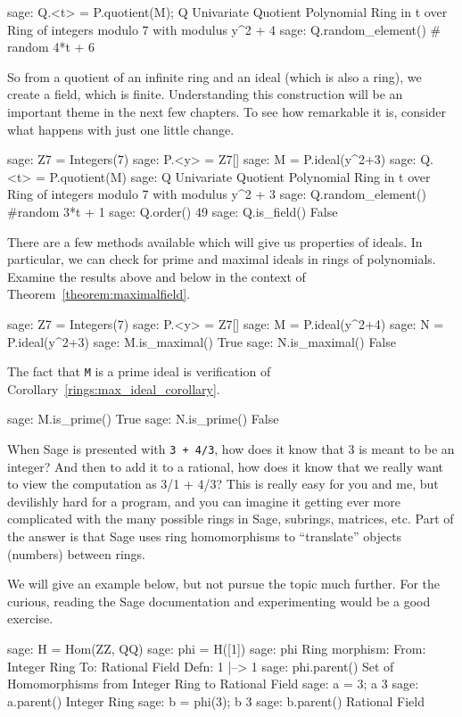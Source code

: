 %
\begin{sageexample}
sage: Q.<t> = P.quotient(M); Q
Univariate Quotient Polynomial Ring in t over
Ring of integers modulo 7 with modulus y^2 + 4
sage: Q.random_element() # random
4*t + 6
\end{sageexample}
%
So from a quotient of an infinite ring and an ideal (which is also a ring), we create a field, which is finite.  Understanding this construction will be an important theme in the next few chapters.  To see how remarkable it is, consider what happens with just one little change.
%
\begin{sageexample}
sage: Z7 = Integers(7)
sage: P.<y> = Z7[]
sage: M = P.ideal(y^2+3)
sage: Q.<t> = P.quotient(M)
sage: Q
Univariate Quotient Polynomial Ring in t over
Ring of integers modulo 7 with modulus y^2 + 3
sage: Q.random_element() #random
3*t + 1
sage: Q.order()
49
sage: Q.is_field()
False
\end{sageexample}
%
There are a few methods available which will give us properties of ideals.  In particular, we can check for prime and maximal ideals in rings of polynomials.  Examine the results above and below in the context of Theorem~\ref{theorem:maximalfield}.
%
\begin{sageexample}
sage: Z7 = Integers(7)
sage: P.<y> = Z7[]
sage: M = P.ideal(y^2+4)
sage: N = P.ideal(y^2+3)
sage: M.is_maximal()
True
sage: N.is_maximal()
False
\end{sageexample}
%
The fact that \verb?M? is a prime ideal is verification of Corollary~\ref{rings:max_ideal_corollary}.
%
\begin{sageexample}
sage: M.is_prime()
True
sage: N.is_prime()
False
\end{sageexample}
%
%
When Sage is presented with \verb?3 + 4/3?, how does it know that 3 is meant to be an integer? And then to add it to a rational, how does it know that we really want to view the computation as 3/1 + 4/3?  This is really easy for you and me, but devilishly hard for a program, and you can imagine it getting ever more complicated with the many possible rings in Sage, subrings, matrices, etc.  Part of the answer is that Sage uses ring homomorphisms to ``translate'' objects (numbers) between rings.\par
%
We will give an example below, but not pursue the topic much further.  For the curious, reading the Sage documentation and experimenting would be a good exercise.
%
\begin{sageexample}
sage: H = Hom(ZZ, QQ)
sage: phi = H([1])
sage: phi
Ring morphism:
  From: Integer Ring
  To:   Rational Field
  Defn: 1 |--> 1
sage: phi.parent()
Set of Homomorphisms from Integer Ring to Rational Field
sage: a = 3; a
3
sage: a.parent()
Integer Ring
sage: b = phi(3); b
3
sage: b.parent()
Rational Field
\end{sageexample}
